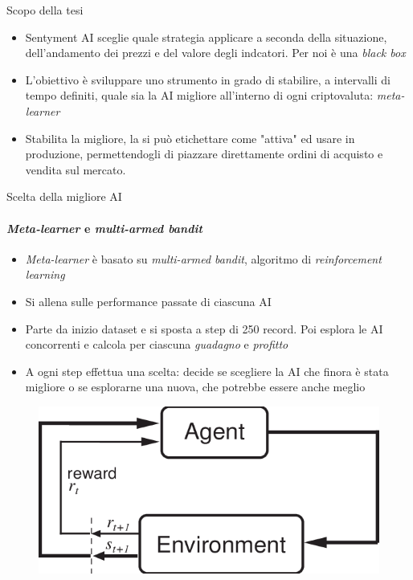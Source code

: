 \documentclass{beamer}
\begin{document}
\begin{frame}{Scopo della tesi}
\begin{itemize}
\item Sentyment AI sceglie quale strategia applicare a seconda della situazione,
dell'andamento dei prezzi e del valore degli indcatori. Per noi è una \textit{black box}
\item L'obiettivo è sviluppare uno strumento in grado di stabilire, a intervalli di tempo definiti,
quale sia la AI migliore all'interno di ogni criptovaluta: \textit{meta-learner}
\item Stabilita la migliore, la si può etichettare come "attiva" ed usare in produzione, permettendogli di piazzare direttamente ordini di acquisto e vendita sul mercato.
\end{itemize}
\end{frame}

\begin{frame}{Scelta della migliore AI}
\framesubtitle{\textit{Meta-learner} e \textit{multi-armed bandit}}
\begin{itemize}
\item \textit{Meta-learner} è basato su \textit{multi-armed bandit}, algoritmo di \textit{reinforcement learning}
\item Si allena sulle performance passate di ciascuna AI
\item Parte da inizio dataset e si sposta a step di 250 record. Poi esplora le AI concorrenti e calcola per ciascuna \textit{guadagno} e \textit{profitto}
\item A ogni step effettua una scelta: decide se scegliere la AI che finora è stata migliore o se esplorarne una nuova, che potrebbe essere anche meglio
\end{itemize}
\begin{figure}
        \centering
        \includegraphics[width=.45\linewidth]{rl}
    \end{figure}
\end{frame}
\end{document}
